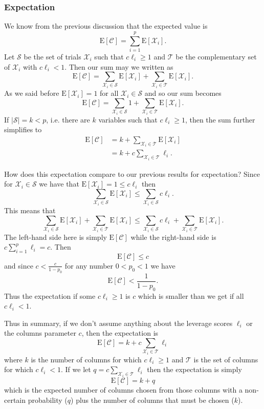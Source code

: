 \documentclass{book}
\begin{document}
\subsubsection{Expectation}
We know from the previous discussion that the expected value is 
$$
\text{E}[\mathscr{C}]=\sum_{i=1}^p\text{E}[\mathscr{X}_i].
$$
Let $\mathcal{S}$ be the set of trials $\mathscr{X}_i$ such that $c\ell_i \geq 1$ and $\mathcal{T}$ be the complementary set of $\mathscr{X}_i$ with $c\ell_i < 1$. Then our sum may we written as
$$
\text{E}[\mathscr{C}]=\sum_{\mathscr{X}_i \in \mathcal{S}}\text{E}[\mathscr{X}_i]+\sum_{\mathscr{X}_i \in \mathcal{T}}\text{E}[\mathscr{X}_i].
$$
As we said before $\text{E}[\mathscr{X}_i]=1$ for all $\mathscr{X}_i\in \mathcal{S}$ and so our sum becomes
$$
\text{E}[\mathscr{C}]=\sum_{\mathscr{X}_i \in \mathcal{S}}1+\sum_{\mathscr{X}_i \in \mathcal{T}}\text{E}[\mathscr{X}_i].
$$
If $|\mathcal{S}|=k < p$, i.e. there are $k$ variables such that $c\ell_i \geq 1$, then the sum further simplifies to
$$
\begin{aligned}
\text{E}[\mathscr{C}]&=k+\sum_{\mathscr{X}_i \in \mathcal{T}}\text{E}[\mathscr{X}_i]\\&
=k+c\sum_{\mathscr{X}_i \in \mathcal{T}}\ell_i.
\end{aligned}
$$

How does this expectation compare to our previous results for expectation? Since for $\mathscr{X}_i\in \mathcal{S}$ we have that $\text{E}[\mathscr{X}_i]=1\leq c\ell_i$ then 
$$
\sum_{\mathscr{X}_i \in \mathcal{S}}\text{E}[\mathscr{X}_i]\leq\sum_{\mathscr{X}_i \in \mathcal{S}}c\ell_i.
$$
This means that 
$$
\sum_{\mathscr{X}_i \in \mathcal{S}}\text{E}[\mathscr{X}_i]+\sum_{\mathscr{X}_i \in \mathcal{T}}\text{E}[\mathscr{X}_i]\leq\sum_{\mathscr{X}_i \in \mathcal{S}}c\ell_i+\sum_{\mathscr{X}_i \in \mathcal{T}}\text{E}[\mathscr{X}_i].
$$
The left-hand side here is simply $\text{E}[\mathscr{C}]$ while the right-hand side is $c\sum_{i=1}^{p}\ell_i=c$. Then 
$$
\text{E}[\mathscr{C}] \leq c  
$$
and since $c < \frac{c}{1-p_0}$ for any number $0<p_0<1$ we have
$$
\text{E}[\mathscr{C}] < \frac{1}{1-p_0}.
$$
Thus the expectation if some $c\ell_i \geq 1$ is $c$ which is smaller than we get if all $c\ell_i< 1$. 


Thus in summary, if we don't assume anything about the leverage scores $\ell_i$ or the columns parameter $c$, then the expectation is 
$$
\text{E}[\mathscr{C}]=k+c\sum_{\mathscr{X}_i \in \mathcal{T}}\ell_i
$$
where $k$ is the number of columns for which $c\ell_i \geq 1$ and $\mathcal{T}$ is the set of columns for which $c\ell_i < 1$. If we let $q=c\sum_{\mathscr{X}_i \in \mathcal{T}}\ell_i$ then the expectation is simply 
$$
\text{E}[\mathscr{C}]=k+q
$$
which is the expected number of columns chosen from those columns with a non-certain probability ($q$) plus the number of columns that must be chosen ($k$). 
\end{document}
